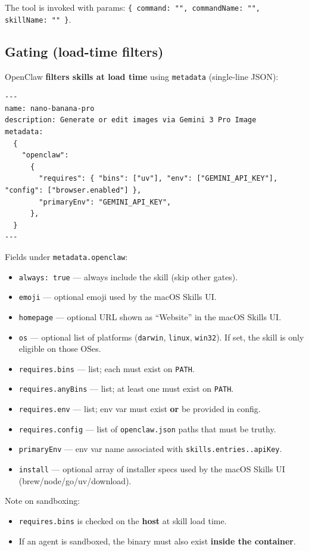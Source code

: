 The tool is invoked with params:
\texttt{\{ command: "", commandName: "", skillName: "" \}}.

\subsection{Gating (load-time filters)}


OpenClaw \textbf{filters skills at load time} using \texttt{metadata} (single-line JSON):

\begin{lstlisting}
---
name: nano-banana-pro
description: Generate or edit images via Gemini 3 Pro Image
metadata:
  {
    "openclaw":
      {
        "requires": { "bins": ["uv"], "env": ["GEMINI_API_KEY"], "config": ["browser.enabled"] },
        "primaryEnv": "GEMINI_API_KEY",
      },
  }
---
\end{lstlisting}


Fields under \texttt{metadata.openclaw}:

\begin{itemize}
  \item \texttt{always: true} — always include the skill (skip other gates).
  \item \texttt{emoji} — optional emoji used by the macOS Skills UI.
  \item \texttt{homepage} — optional URL shown as “Website” in the macOS Skills UI.
  \item \texttt{os} — optional list of platforms (\texttt{darwin}, \texttt{linux}, \texttt{win32}). If set, the skill is only eligible on those OSes.
  \item \texttt{requires.bins} — list; each must exist on \texttt{PATH}.
  \item \texttt{requires.anyBins} — list; at least one must exist on \texttt{PATH}.
  \item \texttt{requires.env} — list; env var must exist \textbf{or} be provided in config.
  \item \texttt{requires.config} — list of \texttt{openclaw.json} paths that must be truthy.
  \item \texttt{primaryEnv} — env var name associated with \texttt{skills.entries..apiKey}.
  \item \texttt{install} — optional array of installer specs used by the macOS Skills UI (brew/node/go/uv/download).
\end{itemize}


Note on sandboxing:

\begin{itemize}
  \item \texttt{requires.bins} is checked on the \textbf{host} at skill load time.
  \item If an agent is sandboxed, the binary must also exist \textbf{inside the container}.
\end{itemize}

